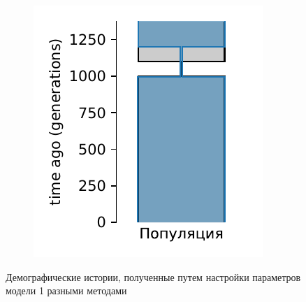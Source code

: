 \begin{figure}[ht]
\begin{subfigure}[b]{.33\textwidth}
    \caption{}
    \label{fig:part2:experiments:simulated_1:results_model_1_2}
    \end{subfigure}%
    \begin{subfigure}[b]{.33\textwidth}
    \includegraphics[width=\textwidth]{images_experiments/simulation_1/1pop/picture_1pop_model_1_ga_over.pdf}
    \caption{}
    \label{fig:part2:experiments:simulated_1:results_model_1_3}
    \end{subfigure}
    \caption{Демографические истории, полученные путем настройки параметров модели 1 разными методами}
    \label{fig:part2:experiments:simulated_1:results_model_1}
\end{figure}

